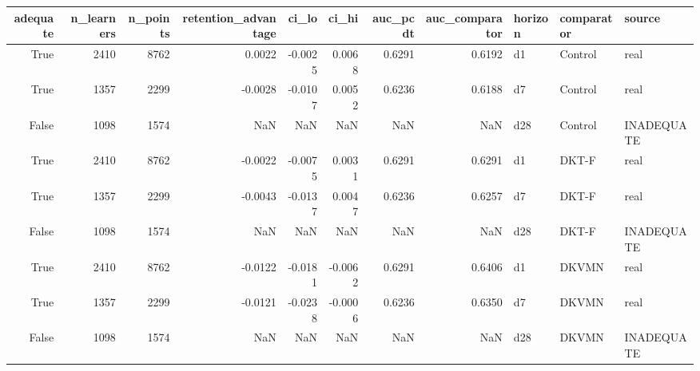 \begin{tabular}{rrrrrrrrlll}
\toprule
adequate & n\_learners & n\_points & retention\_advantage & ci\_lo & ci\_hi & auc\_pcdt & auc\_comparator & horizon & comparator & source \\
\midrule
True & 2410 & 8762 & 0.0022 & -0.0025 & 0.0068 & 0.6291 & 0.6192 & d1 & Control & real \\
True & 1357 & 2299 & -0.0028 & -0.0107 & 0.0052 & 0.6236 & 0.6188 & d7 & Control & real \\
False & 1098 & 1574 & NaN & NaN & NaN & NaN & NaN & d28 & Control & INADEQUATE \\
True & 2410 & 8762 & -0.0022 & -0.0075 & 0.0031 & 0.6291 & 0.6291 & d1 & DKT-F & real \\
True & 1357 & 2299 & -0.0043 & -0.0137 & 0.0047 & 0.6236 & 0.6257 & d7 & DKT-F & real \\
False & 1098 & 1574 & NaN & NaN & NaN & NaN & NaN & d28 & DKT-F & INADEQUATE \\
True & 2410 & 8762 & -0.0122 & -0.0181 & -0.0062 & 0.6291 & 0.6406 & d1 & DKVMN & real \\
True & 1357 & 2299 & -0.0121 & -0.0238 & -0.0006 & 0.6236 & 0.6350 & d7 & DKVMN & real \\
False & 1098 & 1574 & NaN & NaN & NaN & NaN & NaN & d28 & DKVMN & INADEQUATE \\
\bottomrule
\end{tabular}

